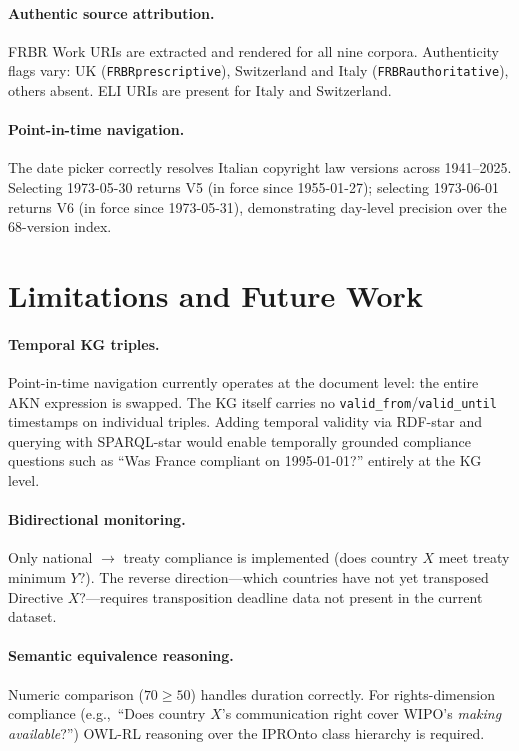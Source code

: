 \documentclass[12pt,a4paper]{article}
\begin{document}
\paragraph{Authentic source attribution.}
FRBR Work URIs are extracted and rendered for all nine corpora.
Authenticity flags vary: UK (\texttt{FRBRprescriptive}), Switzerland and
Italy (\texttt{FRBRauthoritative}), others absent. ELI URIs are present
for Italy and Switzerland.

\paragraph{Point-in-time navigation.}
The date picker correctly resolves Italian copyright law versions across
1941--2025. Selecting 1973-05-30 returns V5 (in force since 1955-01-27);
selecting 1973-06-01 returns V6 (in force since 1973-05-31), demonstrating
day-level precision over the 68-version index.

\section{Limitations and Future Work}

\paragraph{Temporal KG triples.}
Point-in-time navigation currently operates at the document level: the
entire AKN expression is swapped. The KG itself carries no
\texttt{valid\_from}/\texttt{valid\_until} timestamps on individual
triples. Adding temporal validity via RDF-star and querying with
SPARQL-star would enable temporally grounded compliance questions such as
``Was France compliant on 1995-01-01?'' entirely at the KG level.

\paragraph{Bidirectional monitoring.}
Only national $\to$ treaty compliance is implemented (does country $X$
meet treaty minimum $Y$?). The reverse direction---which countries have
not yet transposed Directive $X$?---requires transposition deadline data
not present in the current dataset.

\paragraph{Semantic equivalence reasoning.}
Numeric comparison ($70 \geq 50$) handles duration correctly. For
rights-dimension compliance (e.g.,\ ``Does country $X$'s communication
right cover WIPO's \emph{making available}?'') OWL-RL reasoning over the
IPROnto class hierarchy is required.
\end{document}

